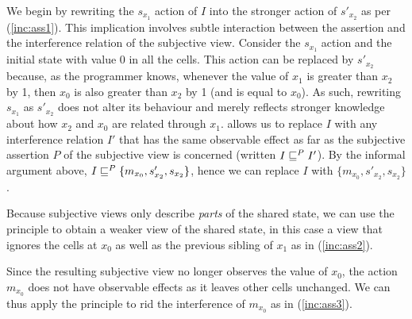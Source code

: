 We begin by rewriting the $s_{x_1}$ action of $I$ into the stronger
action of $s'_{x_2}$ as per (\ref{inc:ass1}). This implication
involves subtle interaction between the assertion and the interference
relation of the subjective view. Consider the $s_{x_1}$ action and the
initial state with value $0$ in all the cells. This action can be
replaced by $s'_{x_2}$ because, as the programmer knows, whenever the
value of $x_1$ is greater than $x_2$ by 1, then $x_0$ is also greater
than $x_2$ by 1 (and is equal to $x_0$). As such, rewriting $s_{x_1}$
as $s'_{x_2}$ does not alter its behaviour and merely reflects
stronger knowledge about how $x_2$ and $x_0$ are related through
$x_1$.
\shiftRule allows us to replace $I$ with any interference relation
$I'$ that has the same observable effect as far as the subjective
assertion $P$ of the subjective view is concerned (written $I
\sqsubseteq^{P} I'$). By the informal argument above, $I\sqsubseteq^{P}
\{m_{x_0}, s'_{x_2}, s_{x_2}\}$, hence we can replace $I$ with
$\{m_{x_0}, s'_{x_2}, s_{x_2}\}$.
%

Because subjective views only describe \emph{parts} of the shared
state, we can use the \forgetRule principle to obtain a weaker view of
the shared state, in this case a view that ignores the cells at $x_0$
as well as the previous sibling of $x_1$ as in (\ref{inc:ass2}).

Since the resulting subjective view no longer observes the value of
$x_0$, the action $m_{x_0}$ does not have observable effects as it
leaves other cells unchanged. We can thus apply the \shiftRule
principle to rid the interference of $m_{x_0}$ as in
(\ref{inc:ass3}).%

